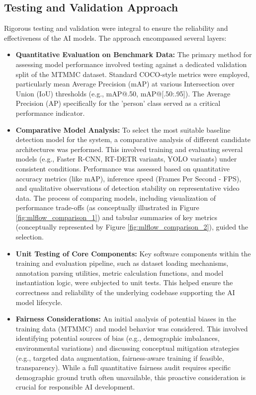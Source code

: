 \subsection{Testing and Validation Approach}
\label{subsection:model_test_validate_new}
Rigorous testing and validation were integral to ensure the reliability and effectiveness of the AI models. The approach encompassed several layers:
\begin{itemize}
    \item \textbf{Quantitative Evaluation on Benchmark Data:} The primary method for assessing model performance involved testing against a dedicated validation split of the MTMMC dataset. Standard COCO-style metrics were employed, particularly mean Average Precision (mAP) at various Intersection over Union (IoU) thresholds (e.g., mAP@.50, mAP@[.50:.95]). The Average Precision (AP) specifically for the 'person' class served as a critical performance indicator.
    \item \textbf{Comparative Model Analysis:} To select the most suitable baseline detection model for the system, a comparative analysis of different candidate architectures was performed. This involved training and evaluating several models (e.g., Faster R-CNN, RT-DETR variants, YOLO variants) under consistent conditions. Performance was assessed based on quantitative accuracy metrics (like mAP), inference speed (Frames Per Second - FPS), and qualitative observations of detection stability on representative video data. The process of comparing models, including visualization of performance trade-offs (as conceptually illustrated in Figure \ref{fig:mlflow_comparison_1}) and tabular summaries of key metrics (conceptually represented by Figure \ref{fig:mlflow_comparison_2}), guided the selection.
    \item \textbf{Unit Testing of Core Components:} Key software components within the training and evaluation pipeline, such as dataset loading mechanisms, annotation parsing utilities, metric calculation functions, and model instantiation logic, were subjected to unit tests. This helped ensure the correctness and reliability of the underlying codebase supporting the AI model lifecycle.
    \item \textbf{Fairness Considerations:} An initial analysis of potential biases in the training data (MTMMC) and model behavior was considered. This involved identifying potential sources of bias (e.g., demographic imbalances, environmental variations) and discussing conceptual mitigation strategies (e.g., targeted data augmentation, fairness-aware training if feasible, transparency). While a full quantitative fairness audit requires specific demographic ground truth often unavailable, this proactive consideration is crucial for responsible AI development.
\end{itemize}

